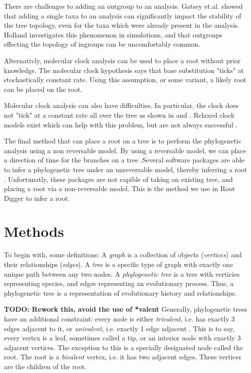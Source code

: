\documentclass{article}
\begin{document}
There are challenges to adding  an  outgroup  to  an  analysis.   Gatsey  et.al.
\cite{gatesy_how_2007} showed that adding a  single  taxa  to  an  analysis  can
significantly impact the stability of the tree topology, even for the taxa which
were already present  in  the  analysis.   Holland  \cite{holland_outgroup_2003}
investigates this phenomenon in simulations, and that  outgroups  effecting  the
topology of ingroups can be uncomfortably common.

Alternativly, molecular clock analysis can be used to place a root without prior
knowledge\cite{yang_computational_2006}. The molecular clock hypothesis says
that base substitution "ticks" at stochastically constant rate. Using this
assumption, or some variant, a likely root can be placed on the root.

Molecular clock analysis can also have difficulties. In particular, the clock
does not "tick" at a constant rate all over the tree as shown in
\cite{steiper_primate_2006} and \cite{li_molecular_1987}. Relaxed clock models
exist which can help with this problem, but are not always successful
\cite{battistuzzi_performance_2010}.

The final method that can place a root on a tree is to perform the phylogenetic
analysis using a non reversable model. By using a reversable model, we can place
a direction of time for the branches on a tree \cite{yap_rooting_2005}.Several
software packages are able to infer a phylogenetic tree under an unreversable
model, thereby inferring a root \cite{nguyen_iq-tree:_2015}
\cite{ronquist_mrbayes_2003}. Unfortunatly, these packages are not capible of
taking an existing tree, and placing a root via a non-reversable model. This is
the method we use in Root Digger to infer a root.

\section{Methods}

To begin with, some definitions: A \textit{graph} is a collection of objects
(\textit{vertices}) and their relationships ({\em edges}). A {\em tree} is a
specific type of graph with exactly one unique path between any two nodes. A
{\em phylogenetic tree} is a tree with verticies representing species, and edges
representing an evolutionary process.  Thus, a phylogenetic tree is a
representation of evolutionary history and relationships.

{\bf TODO: Rework this, avoid the use of *valent}
Generally, phylogenetic trees have an additional constraint: every node is
either {\em trivalent}, i.e. has exactly 3 edges adjacent to it, or {\em
univalent}, i.e. exactly 1 edge adjacent . This is to say, every vertex is a
leaf, sometimes called a tip, or an interior node with exactly 3 adjacent
vertices. The exception to this is a specially designated node called the root.
The root is a {\em bivalent} vertex, i.e. it has two adjacent edges. These
vertices are the children of the root.
\end{document}
